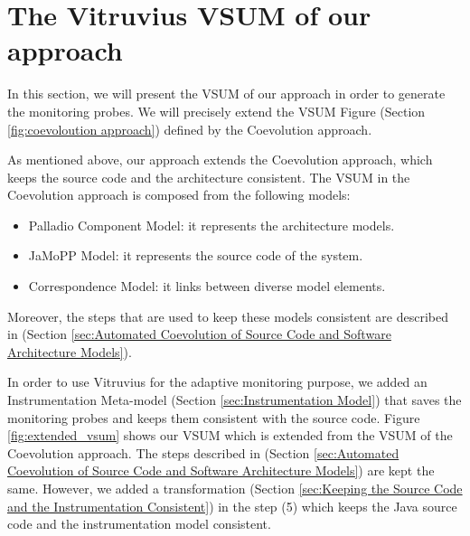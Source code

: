 \section{The Vitruvius VSUM of our approach}
\label{sec:The Vitruvius VSUM of our approach}

In this section, we will present the VSUM of our approach in order to generate the monitoring probes. We will precisely extend the VSUM Figure (Section \ref{fig:coevoloution approach}) defined by the Coevolution approach.

As mentioned above, our approach extends the Coevolution approach, which keeps the source code and the architecture consistent. The VSUM in the Coevolution approach is composed from the following models:
\begin{itemize}
\item Palladio Component Model: it represents the architecture models.
\item JaMoPP Model: it represents the source code of the system.
\item Correspondence Model: it links between diverse model elements.
\end{itemize}
Moreover, the steps that are used to keep these models consistent are described in (Section \ref{sec:Automated Coevolution of Source Code and Software Architecture Models}). 

In order to use Vitruvius for the adaptive monitoring purpose, we added an Instrumentation Meta-model (Section \ref{sec:Instrumentation Model}) that saves the monitoring probes and keeps them consistent with the source code. Figure \ref{fig:extended_vsum} shows our VSUM which is extended from the VSUM of the Coevolution approach. The steps described in (Section \ref{sec:Automated Coevolution of Source Code and Software Architecture Models}) are kept the same. However, we added a transformation (Section \ref{sec:Keeping the Source Code and the Instrumentation Consistent}) in the step (5) which keeps the Java source code and the instrumentation model consistent. 

